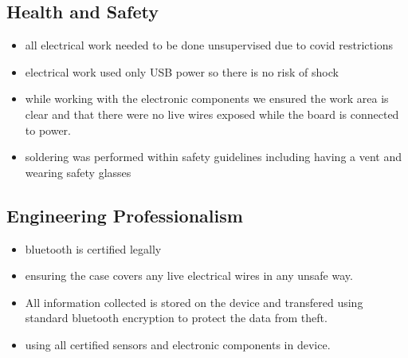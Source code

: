 \subsection{Health and Safety}
\begin{itemize}
    \item all electrical work needed to be done unsupervised due to covid restrictions
    \item electrical work used only USB power so there is no risk of shock
    \item while working with the electronic components we ensured the work area is clear and that there were no live wires exposed while the board is connected to power.
    \item soldering was performed within safety guidelines including having a vent and wearing safety glasses
\end{itemize}

\subsection{Engineering Professionalism}
\begin{itemize}
    \item bluetooth is certified legally 
    \item ensuring the case covers any live electrical wires in any unsafe way.
    \item All information collected is stored on the device and transfered using standard bluetooth encryption to protect the data from theft.
    \item using all certified sensors and electronic components in device.
\end{itemize}

